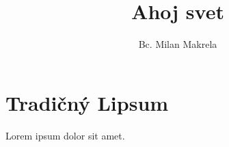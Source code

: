 \documentclass{rnthesis}
\title{Ahoj svet}
\author{Bc. Milan Makrela}
\begin{document}
\maketitle
\newpage
\chapter{Tradičný Lipsum}
Lorem ipsum dolor sit amet.
\end{document}
